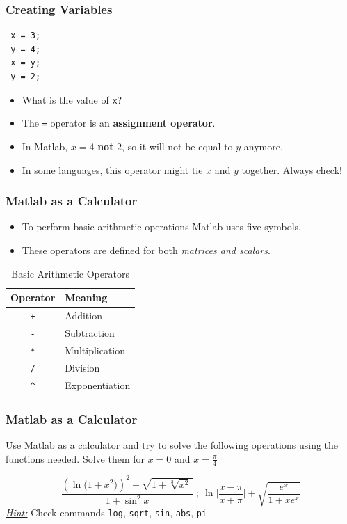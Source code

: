 \documentclass[11pt,xcolor={svgnames},aspectratio=169,usepdftitle=false,notheorems]{beamer}
\begin{document}
\begin{frame}[fragile]
  \frametitle{Creating Variables}
 \begin{lstlisting}
 x = 3;
 y = 4;
 x = y;
 y = 2;
 \end{lstlisting}
 \begin{itemize}
  \item What is the value of \verb;x;?
  \pause
  \item The \verb;=; operator is an \alert{\textbf{assignment operator}}. 
  \item In Matlab, $x = 4$ \alert{\textbf{not}} $2$, so it will not be equal to $y$ anymore. 
  \item In some languages, this operator might tie $x$ and $y$ together. Always check!
 \end{itemize}
  
\end{frame}

\begin{frame}[fragile]
    \frametitle{Matlab as a Calculator}
    \begin{itemize}
        \item To perform basic arithmetic operations Matlab uses five symbols.
        \item These operators are defined for both \alert{\textit{matrices and scalars}}.
    \end{itemize}
\begin{table}[htbp]
    \caption{Basic Arithmetic Operators}
    \label{tab:basic_operators}
    \begin{tabular}{@{}cl@{}}
    \toprule
    Operator & Meaning \\ \midrule
    \verb;+;  & Addition \\ 
    \verb;-;  & Subtraction \\ 
    \verb;*;  & Multiplication \\ 
    \verb;/;  & Division \\ 
    \verb;^;  & Exponentiation \\ \bottomrule
    \end{tabular}
\end{table}
\end{frame}

\begin{frame}[fragile]
    \frametitle{Matlab as a Calculator}
\begin{exercise} 
    Use Matlab as a calculator and try to solve the following operations using the functions needed. Solve them for $x = 0$ and $x = \frac{\pi}{4}$
    
    \[
            \frac{\left(\ln\big( 1+x^2\big)\right)^2 - \sqrt{1+\sqrt[3]{x^2}\,}}{1+\sin^2 x} \ ; \  \ln\bigg\lvert\frac{x-\pi}{x+\pi}\bigg\rvert + \sqrt{\frac{e^x}{1+xe^x}}
    \]
    \textit{\underline{Hint:}} Check commands \verb;log;, \verb;sqrt;, \verb;sin;, \verb;abs;, \verb;pi;
\end{exercise}
\end{frame}
\end{document}
